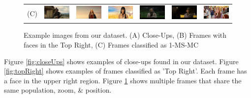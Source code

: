 \begin{figure}[t!]
\begin{center}
\begin{tabular}{ccccccc}
\large{(C)}
& \includegraphics[width=0.12\linewidth]
  {fig/clust/09.jpg} 
& \includegraphics[width=0.12\linewidth]
  {fig/clust/10.jpg}  
& \includegraphics[width=0.12\linewidth]
  {fig/clust/11.jpg}   
& \includegraphics[width=0.12\linewidth]
  {fig/clust/03.jpg} 
& \includegraphics[width=0.12\linewidth]
  {fig/clust/04.jpg}  
& \includegraphics[width=0.12\linewidth]
  {fig/clust/15.jpg}   
\\
\end{tabular}
\end{center}
   \caption{Example images from our dataset. (A) Close-Ups, (B) Frames with faces in the Top Right, (C) Frames classified as 1-MS-MC}
\label{fig:closeUps}
\label{fig:topRight}
\label{fig:cluster}
\end{figure}

Figure \ref{fig:closeUps} shows examples of close-ups found in our dataset.
Figure \ref{fig:topRight} shows examples of frames classified as 'Top Right'. Each frame has a face in the upper right region.
Figure \ref{fig:cluster} shows multiple frames that share the same population, zoom, \& position.

